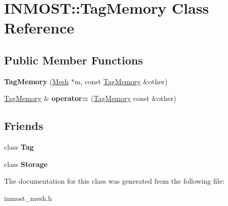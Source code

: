 \hypertarget{classINMOST_1_1TagMemory}{\section{I\-N\-M\-O\-S\-T\-:\-:Tag\-Memory Class Reference}
\label{classINMOST_1_1TagMemory}
}
\subsection*{Public Member Functions}
\begin{DoxyCompactItemize}
\item 
\hypertarget{classINMOST_1_1TagMemory_ac07aafafbfda25b163f64cb6d3b7cec4}{{\bfseries Tag\-Memory} (\hyperlink{classINMOST_1_1Mesh}{Mesh} $\ast$m, const \hyperlink{classINMOST_1_1TagMemory}{Tag\-Memory} \&other)}\label{classINMOST_1_1TagMemory_ac07aafafbfda25b163f64cb6d3b7cec4}

\item 
\hypertarget{classINMOST_1_1TagMemory_a9e54be3865bc8f02c512292c924f840c}{\hyperlink{classINMOST_1_1TagMemory}{Tag\-Memory} \& {\bfseries operator=} (\hyperlink{classINMOST_1_1TagMemory}{Tag\-Memory} const \&other)}\label{classINMOST_1_1TagMemory_a9e54be3865bc8f02c512292c924f840c}

\end{DoxyCompactItemize}
\subsection*{Friends}
\begin{DoxyCompactItemize}
\item 
\hypertarget{classINMOST_1_1TagMemory_afc8c1b0e7f1fedf25715bd33b74eb56c}{class {\bfseries Tag}}\label{classINMOST_1_1TagMemory_afc8c1b0e7f1fedf25715bd33b74eb56c}

\item 
\hypertarget{classINMOST_1_1TagMemory_ab647623b3295040f83d3afb2a502a223}{class {\bfseries Storage}}\label{classINMOST_1_1TagMemory_ab647623b3295040f83d3afb2a502a223}

\end{DoxyCompactItemize}


The documentation for this class was generated from the following file\-:\begin{DoxyCompactItemize}
\item 
inmost\-\_\-mesh.\-h\end{DoxyCompactItemize}
